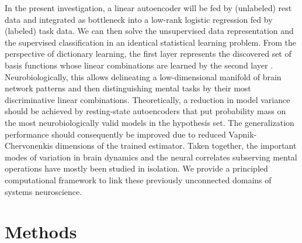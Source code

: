 \documentclass{article} %
\begin{document}
In the present investigation,
a linear autoencoder will be fed by (unlabeled) rest data and
integrated as bottleneck
into a low-rank logistic regression fed by (labeled) task data.
We can then solve the unsupervised data representation and the
supervised classification in an identical statistical learning
problem.
%
From the perspective of dictionary learning, the first layer represents
the discovered set of basis functions
whose linear combinations are learned
by the second layer \cite{olshausen96}.
%
Neurobiologically, this allows 
delineating a low-dimensional manifold of brain network patterns and then 
distinguishing mental tasks
by their most discriminative linear combinations.
%
Theoretically, a reduction in model variance should be achieved by
resting-state autoencoders that
put probability mass on the most neurobiologically
valid models in the hypothesis set.
%
The generalization performance should consequently be improved due to 
reduced Vapnik-Chervonenkis dimensions of the trained estimator.
%
Taken together,
the important modes of variation in brain dynamics and
the neural correlates subserving mental operations
have mostly been studied in isolation.
We provide a principled computational framework to link these previously
unconnected domains of systems neuroscience.


\section{Methods}
%
\end{document}
